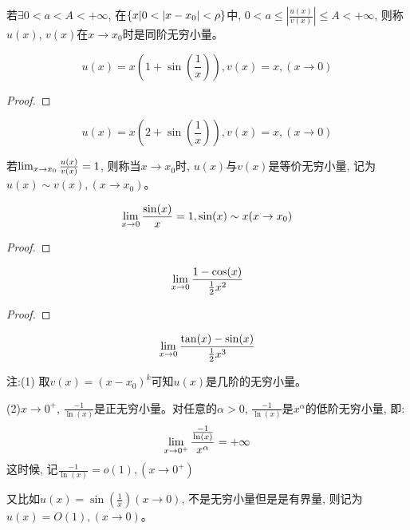 \documentclass[lang=cn]{elegantbook}
\begin{document}
\begin{definition}
    若$\exists 0 < a < A < +\infty$, 在$\left\{ x|  0 < \left| x - x_0\right| < \rho\right\}$中, $0 < a \le \left| \frac{u(x)}{v(x)} \right| \le A < +\infty$, 则称$u(x)$, $v(x)$在$x \to x_0$时是同阶无穷小量。
\end{definition}

\begin{proposition}
    \[ u(x) = x(1+\sin\left( \frac{1}{x} \right)), v(x) = x, (x \to 0) \]
\end{proposition}
\begin{proof}
    
\end{proof}

\begin{proposition}
    \[ u(x) = x(2+\sin\left( \frac{1}{x} \right)), v(x) = x, (x \to 0) \]
\end{proposition}

\begin{definition}
    若$\lim_{x \to x_0 } \frac{u(x)}{v(x)} = 1$, 则称当$x \to x_0$时, $u(x)$与$v(x)$是等价无穷小量, 记为$u(x)\sim v(x), (x \to x_0)$。
\end{definition}
\begin{proposition}
    \[ \lim_{x \to 0 } \frac{\sin(x)}{x} = 1, \sin(x) \sim x(x \to x_0)\]
\end{proposition}
\begin{proof}
    
\end{proof}
\begin{proposition}
    \[ \lim_{x \to 0 } \frac{1- \cos(x)}{\frac{1}{2}x^2} \]
\end{proposition}
\begin{proof}
    
\end{proof}
\begin{proposition}
    \[ \lim_{x \to 0 } \frac{\tan(x) - \sin(x)}{\frac{1}{2}x^3} \]    
\end{proposition}

注:(1) 取$v(x) = (x - x_0)^k$可知$u(x)$是几阶的无穷小量。

(2)$x \to 0^+$, $\frac{-1}{\ln (x)}$是正无穷小量。对任意的$\alpha > 0$, $\frac{-1}{\ln (x)}$是$x^\alpha$的低阶无穷小量, 即:
\[ \lim_{x \to 0^+ } \frac{\frac{-1}{\ln (x)}}{x^\alpha} = +\infty\]
这时候, 记$\frac{-1}{\ln (x)} = o(1), (x \to 0^+)$

又比如$u(x) = \sin\left( \frac{1}{x}\right)(x \to 0)$, 不是无穷小量但是是有界量, 则记为$u(x) = O(1), (x \to 0)$。
\end{document}
